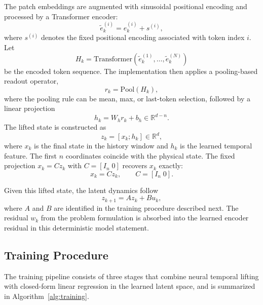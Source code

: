 \documentclass[journal]{IEEEtran}
\begin{document}
The patch embeddings are augmented with sinusoidal positional encoding and processed by a Transformer encoder:
\begin{equation}
    \tilde{e}_k^{(i)} = e_k^{(i)} + s^{(i)},
\end{equation}
where $s^{(i)}$ denotes the fixed positional encoding associated with token index $i$. Let
\begin{equation}
    H_k = \mathrm{Transformer}(\tilde{e}_k^{(1)},\ldots,\tilde{e}_k^{(N)})
\end{equation}
be the encoded token sequence. The implementation then applies a pooling-based readout operator,
\begin{equation}
    r_k = \mathrm{Pool}(H_k),
\end{equation}
where the pooling rule can be mean, max, or last-token selection, followed by a linear projection
\begin{equation}
    h_k = W_h r_k + b_h \in \mathbb{R}^{d-n}.
    \label{eq:history_feature}
\end{equation}
The lifted state is constructed as
\begin{equation}
    z_k = [x_k;h_k] \in \mathbb{R}^{d},
    \label{eq:lifted_state_form}
\end{equation}
where $x_k$ is the final state in the history window and $h_k$ is the learned temporal feature. The first $n$ coordinates coincide with the physical state. The fixed projection $x_k=Cz_k$ with $C=[I_n\;0]$ recovers $x_k$ exactly:
\begin{equation}
    x_k = C z_k, \qquad C = [I_n\;0].
    \label{eq:decoder_projection}
\end{equation}

Given this lifted state, the latent dynamics follow
\begin{equation}
    z_{k+1} = A z_k + B u_k,
    \label{eq:temporal_dynamics}
\end{equation}
where $A$ and $B$ are identified in the training procedure described next. The residual $w_k$ from the problem formulation is absorbed into the learned encoder residual in this deterministic model statement.

\subsection{Training Procedure}
\label{sec:training}

The training pipeline consists of three stages that combine neural temporal lifting with closed-form linear regression in the learned latent space, and is summarized in Algorithm~\ref{alg:training}.
\end{document}
